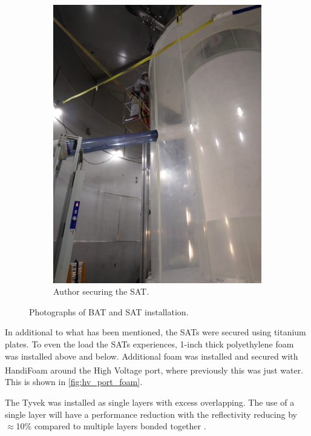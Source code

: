 \begin{figure}[!tbph]
\begin{subfigure}{.5\textwidth}
  \includegraphics[angle=-90, width=\linewidth]{Figures/Construction/SAT_titanium_plate.JPG}
  \caption{Author securing the SAT.}
  \label{fig:SAT_titanium_installation}
  \end{subfigure}
\caption{Photographs of BAT and SAT installation.}
\label{fig:sat_and_bat_installation}
\end{figure}

\par
In additional to what has been mentioned, the SATs were secured using titanium plates.
To even the load the SATs experiences, 1-inch thick polyethylene foam was installed above and below.
Additional foam was installed and secured with HandiFoam\textsuperscript{\textregistered} around the High Voltage port, where previously this was just water.
This is shown in \autoref{fig:hv_port_foam}.

\par
The Tyvek was installed as single layers with excess overlapping.
The use of a single layer will have a performance reduction with the reflectivity reducing by $\approx$10\% compared to multiple layers bonded together \cite{tyvek_reflectivity_ref}.

